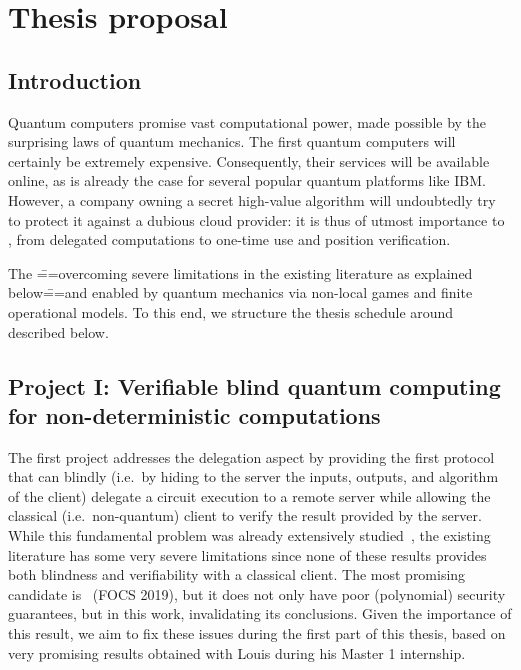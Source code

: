 

\section{Thesis proposal}

\subsection{Introduction}

Quantum computers promise vast computational power, made possible by the surprising laws of quantum mechanics. The first quantum computers will certainly be extremely expensive. Consequently, their services will be available online, as is already the case for several popular quantum platforms like IBM. However, a company owning a secret high-value algorithm will undoubtedly try to protect it against a dubious cloud provider: it is thus of utmost importance to , from delegated computations to one-time use and position verification.

The \===overcoming severe limitations in the existing literature as explained below\===and  enabled by quantum mechanics via non-local games and finite operational models. To this end, we structure the thesis schedule around  described below.

\subsection{Project I: Verifiable blind quantum computing for non-deterministic computations}

The first project addresses the delegation aspect by providing the first protocol that can blindly (i.e.\ by hiding to the server the inputs, outputs, and algorithm of the client) delegate a circuit execution to a remote server while allowing the classical (i.e.\ non-quantum) client to verify the result provided by the server. While this fundamental problem was already extensively studied~\cite{CCKW19_QFactoryClassicallyInstructedRemote,mahadev_classical_2018}, the existing literature has some very severe limitations since none of these results provides both blindness and verifiability with a classical client. The most promising candidate is~\cite{GV19_ComputationallySecureComposableRemote} (FOCS 2019), but it does not only have poor (polynomial) security guarantees, but  in this work, invalidating its conclusions. Given the importance of this result, we aim to fix these issues during the first part of this thesis, based on very promising results obtained with Louis during his Master 1 internship.

